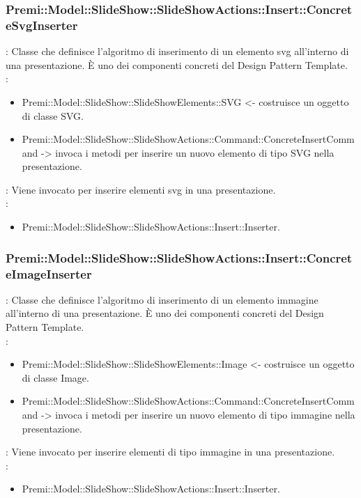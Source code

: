{       \subsubsection{Premi::Model::SlideShow::SlideShowActions::Insert::ConcreteSvgInserter}{
				\textbf{\tipo}: Classe che definisce l'algoritmo di inserimento di un elemento svg all’interno di una presentazione.
È uno dei componenti concreti del Design Pattern Template.\\	
				\textbf{\relaz}: 
				\begin{itemize}
				\item Premi::Model::SlideShow::SlideShowElements::SVG <- costruisce un oggetto di classe SVG.
					\item Premi::Model::SlideShow::SlideShowActions::Command::ConcreteInsertCommand -> invoca i metodi per inserire un nuovo elemento di tipo SVG nella presentazione.
				\end{itemize} 
				\textbf{\interfacce}: Viene invocato per inserire elementi svg in una presentazione.\\
                \textbf{\base}: 
                    \begin{itemize}
                    \item Premi::Model::SlideShow::SlideShowActions::Insert::Inserter.
                    \end{itemize}
			}
       \subsubsection{Premi::Model::SlideShow::SlideShowActions::Insert::ConcreteImageInserter}{
				\textbf{\tipo}: Classe che definisce l'algoritmo di inserimento di un elemento immagine all’interno di una presentazione.
È uno dei componenti concreti del Design Pattern Template.\\	
				\textbf{\relaz}: 
				\begin{itemize}
				\item Premi::Model::SlideShow::SlideShowElements::Image <- costruisce un oggetto di classe Image.
					\item Premi::Model::SlideShow::SlideShowActions::Command::ConcreteInsertCommand -> invoca i metodi per inserire un nuovo elemento di tipo immagine nella presentazione.
				\end{itemize} 
				\textbf{\interfacce}: Viene invocato per inserire elementi di tipo immagine in una presentazione.\\
                \textbf{\base}: 
                    \begin{itemize}
                    \item Premi::Model::SlideShow::SlideShowActions::Insert::Inserter.
                    \end{itemize}
			}
}
